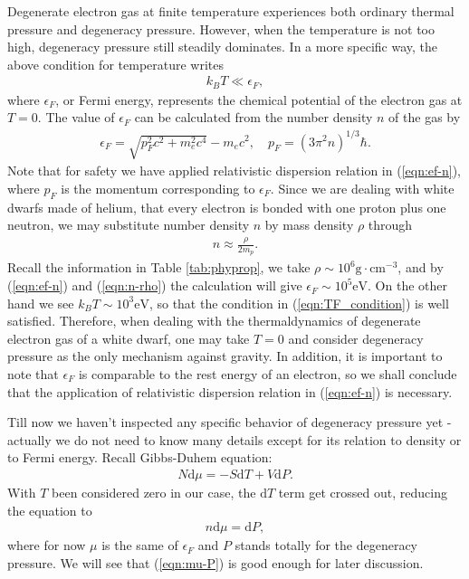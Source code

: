 \documentclass[a4paper,11pt]{article}
\newcommand{\mathdd}{\mathrm{d}}
\numberwithin{equation}{section}
\numberwithin{table}{section}
\numberwithin{figure}{section}
\begin{document}
			Degenerate electron gas at finite temperature experiences both ordinary thermal pressure and degeneracy pressure. However, when the temperature is not too high, degeneracy pressure still steadily dominates\cite{pathria2012statmech}. In a more specific way, the above condition for temperature writes
			\begin{align}
				k_BT\ll\epsilon_F, 
				\label{eqn:TF_condition}
			\end{align}
			where $\epsilon_F$, or Fermi energy, represents the chemical potential of the electron gas at $T=0$. The value of $\epsilon_F$ can be calculated from the number density $n$ of the gas by 
			\begin{align}
				\epsilon_F=\sqrt{p_F^2c^2+m_e^2c^4}-m_ec^2, \quad
				p_F=(3\pi^2n)^{1/3}\hbar.
				\label{eqn:ef-n}
			\end{align}
			Note that for safety we have applied relativistic dispersion relation in (\ref{eqn:ef-n}), where $p_F$ is the momentum corresponding to $\epsilon_F$. Since we are dealing with white dwarfs made of helium, that every electron is bonded with one proton plus one neutron, we may substitute number density $n$ by mass density $\rho$ through
			\begin{align}
				n\approx\frac{\rho}{2m_p}.
				\label{eqn:n-rho}
			\end{align}
			Recall the information in Table \ref{tab:phyprop}, we take $\rho\sim10^6\mathrm{g\cdot cm^{-3}}$, and by (\ref{eqn:ef-n}) and (\ref{eqn:n-rho}) the calculation will give $\epsilon_F\sim10^5\mathrm{eV}$. On the other hand we see $k_BT\sim10^3\mathrm{eV}$, so that the condition in (\ref{eqn:TF_condition}) is well satisfied. Therefore, when dealing with the thermaldynamics of degenerate electron gas of a white dwarf, one may take $T=0$ and consider degeneracy pressure as the only mechanism against gravity. In addition, it is important to note that $\epsilon_F$ is comparable to the rest energy of an electron, so we shall conclude that the application of relativistic dispersion relation in (\ref{eqn:ef-n}) is necessary.
			
			Till now we haven't inspected any specific behavior of degeneracy pressure yet - actually we do not need to know many details except for its relation to density or to Fermi energy. Recall Gibbs-Duhem equation: 
			\begin{align}
				N\mathdd\mu=-S\mathdd T+V\mathdd P.
			\end{align}
			With $T$ been considered zero in our case, the $\mathdd T$ term get crossed out, reducing the equation to
			\begin{align}
				n\mathdd\mu=\mathdd P,
				\label{eqn:mu-P}
			\end{align}
			where for now $\mu$ is the same of $\epsilon_F$ and $P$ stands totally for the degeneracy pressure. We will see that (\ref{eqn:mu-P}) is good enough for later discussion.
			
\end{document}
